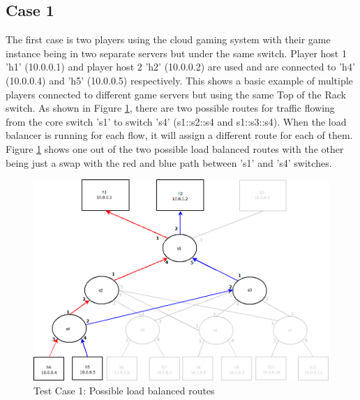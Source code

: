 \clearpage
\subsection{Case 1}
The first case is two players using the cloud gaming system with their game instance being in two separate servers but under the same switch. Player host 1 'h1' (10.0.0.1) and player host 2 'h2' (10.0.0.2) are used and are connected to 'h4' (10.0.0.4) and 'h5' (10.0.0.5) respectively. This shows a basic example of multiple players connected to different game servers but using the same Top of the Rack switch. As shown in Figure \ref{fig:test1}, there are two possible routes for traffic flowing from the core switch 's1' to switch 's4' (s1::s2::s4 and s1::s3::s4). When the load balancer is running for each flow, it will assign a different route for each of them. Figure \ref{fig:test1} shows one out of the two possible load balanced routes with the other being just a swap with the red and blue path between 's1' and 's4' switches.
\newline
\begin{figure}[h!]
 \includegraphics[width=\linewidth]{images/test1.png}
 \caption{Test Case 1: Possible load balanced routes}
 \label{fig:test1}
\end{figure}

\clearpage
